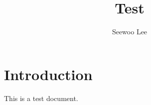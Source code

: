 \documentclass{article}
\title{Test}
\author{Seewoo Lee}
\begin{document}
\maketitle

\section{Introduction}

This is a test document.
\end{document}
